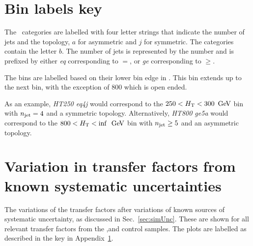 \clearpage
\section{Bin labels key}
\label{app:plotKey}

The \nj ~categories are labelled with four letter strings that indicate
the number of jets and the topology, $a$ for asymmetric and $j$ for
symmetric. The \nb categories contain the letter $b$. The number of
jets is represented by the number and is prefixed by either \emph{eq}
corresponding to $=$, or \emph{ge} corresponding to $\geq$.

The \HT bins are labelled based on their lower bin edge in \gev. This
bin extends up to the next \HT bin, with the exception of $800$ which
is open ended.

As an example, \emph{HT250 eq4j} would correspond to the
$250<\mbox{$H_\text{T}$}<300~\mathrm{\,Ge\kern -0.1em V}$ bin with $n_{\mathrm{jet}}=4$ and a symmetric topology.
Alternatively, \emph{HT800 ge5a} would correspond to the
$800<\mbox{$H_\text{T}$}<\inf~\mathrm{\,Ge\kern -0.1em V}$ bin with $n_{\mathrm{jet}}\geq5$ and an asymmetric topology.

\section{Variation in transfer factors from known systematic
uncertainties}
\label{app:tfSysts}

The variations of the transfer factors after variations of known
sources of systematic uncertainty, as discussed in
Sec.~\ref{sec:simUnc}. These are shown for all relevant transfer
factors from the \gj,\mj and \mmj control samples. The plots are
labelled as described in the key in Appendix~\ref{app:plotKey}.

